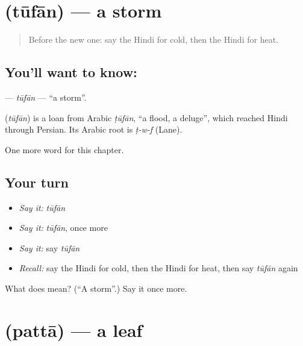 \section[\texorpdfstring{\hi{तूफ़ान} (tūfān)}{तूफ़ान (tūfān)}]{ (tūfān) — a storm}

\label{lesson:HI-C185-tufan}



\begin{quote}
Before the new one: say the Hindi for cold, then the Hindi for heat.
\end{quote}

\subsection*{You'll want to know: }
\textbf{} — \emph{tūfān} — \textquotedblleft{}a storm\textquotedblright{}.

\begin{cousinweb}
\textbf{} (\emph{tūfān}) is a loan from Arabic \emph{ṭūfān}, \textquotedblleft{}a flood, a deluge\textquotedblright{}, which reached Hindi through Persian. Its Arabic root is \emph{ṭ-w-f} (Lane).
\end{cousinweb}

\begin{grammarlens}[title={What you've built}]
One more word for this chapter.
\end{grammarlens}

\subsection*{Your turn}
\begin{itemize}
\raggedright
  \item \emph{Say it:} \emph{tūfān}
  \item \emph{Say it:} \emph{tūfān}, once more
  \item \emph{Say it:} say \emph{tūfān}
  \item \emph{Recall:} say the Hindi for cold, then the Hindi for heat, then say \emph{tūfān} again
\end{itemize}

\begin{tcolorbox}[breakable,colback=teal!4,colframe=teal!35!black,title={Before you move on}]
What does  mean? (\textquotedblleft{}A storm\textquotedblright{}.) Say it once more.
\end{tcolorbox}
\section[\texorpdfstring{\hi{पत्ता} (pattā)}{पत्ता (pattā)}]{ (pattā) — a leaf}


